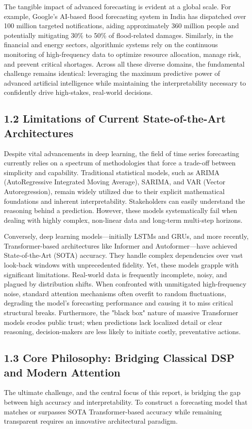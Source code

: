 \documentclass[11pt, letterpaper]{article}
\begin{document}
The tangible impact of advanced forecasting is evident at a global scale. For example, Google's AI-based flood forecasting system in India has dispatched over 100 million targeted notifications, aiding approximately 360 million people and potentially mitigating 30\% to 50\% of flood-related damages. Similarly, in the financial and energy sectors, algorithmic systems rely on the continuous monitoring of high-frequency data to optimize resource allocation, manage risk, and prevent critical shortages. Across all these diverse domains, the fundamental challenge remains identical: leveraging the maximum predictive power of advanced artificial intelligence while maintaining the interpretability necessary to confidently drive high-stakes, real-world decisions.

\subsection{1.2 Limitations of Current State-of-the-Art Architectures}
Despite vital advancements in deep learning, the field of time series forecasting currently relies on a spectrum of methodologies that force a trade-off between simplicity and capability. Traditional statistical models, such as ARIMA (AutoRegressive Integrated Moving Average), SARIMA, and VAR (Vector Autoregression), remain widely utilized due to their explicit mathematical foundations and inherent interpretability. Stakeholders can easily understand the reasoning behind a prediction. However, these models systematically fail when dealing with highly complex, non-linear data and long-term multi-step horizons.

Conversely, deep learning models---initially LSTMs and GRUs, and more recently, Transformer-based architectures like Informer and Autoformer---have achieved State-of-the-Art (SOTA) accuracy. They handle complex dependencies over vast look-back windows with unprecedented fidelity. Yet, these models grapple with significant limitations. Real-world data is frequently incomplete, noisy, and plagued by distribution shifts. When confronted with unmitigated high-frequency noise, standard attention mechanisms often overfit to random fluctuations, degrading the model's forecasting performance and causing it to miss critical structural breaks. Furthermore, the "black box" nature of massive Transformer models erodes public trust; when predictions lack localized detail or clear reasoning, decision-makers are less likely to initiate costly, preventative actions.

\subsection{1.3 Core Philosophy: Bridging Classical DSP and Modern Attention}
The ultimate challenge, and the central focus of this report, is bridging the gap between high accuracy and interpretability. To construct a forecasting model that matches or surpasses SOTA Transformer-based accuracy while remaining transparent requires an innovative architectural paradigm. 
\end{document}
